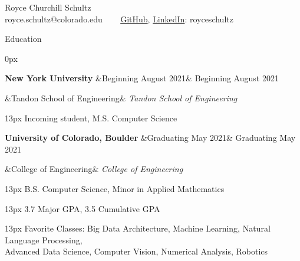 \documentclass{article}
\newcommand{\horizontalBreaker}{\ \ \ }
\newcommand{\sectionIndent}{13px}
\newcommand{\primaryFont}{\rmfamily}
\newcommand{\accentFont}{\sffamily}
\newcommand{\sectionHeader}[1]{
  \vspace{3px}
  \accentFont \color{primary} \large
  #1
  \color{black}
  \primaryFont
  \hrulefill
  \vspace{1px}
}
\newcommand{\itemHeader}[3]{
  \vspace{8px}
  \large \textbf{#1}
  \ifx&#3&
  \else
    \color{primary} \accentFont \normalsize
    \hfill #3
    \color{black} \primaryFont
  \fi

  \ifx&#2&
  \else
    \vspace{2px}
    \large
    \textit{#2}
  \fi
}
\newcommand{\itemContent}[1]{
  \vspace{1px} \normalsize
  \begin{addmargin}{\sectionIndent}
    #1
    \vspace{1px}
  \end{addmargin}
}
\begin{document}
  \begin{center}
      {\Huge  \primaryFont Royce Churchill Schultz}\\
          \vspace{6px}
      {\normalsize
          royce.schultz@colorado.edu \horizontalBreaker
          \href{https://www.github.com/royceschultz}{GitHub}, \href{https://linkedin.com/in/royceschultz}{LinkedIn}: royceschultz
      }
  \end{center}

  \sectionHeader{Education}
  \begin{addmargin}[\sectionIndent]{0px}
    \itemHeader
      {New York University}
      {Tandon School of Engineering}
      {Beginning August 2021}
    \itemContent{Incoming student, M.S. Computer Science}

    \itemHeader
      {University of Colorado, Boulder}
      {College of Engineering}
      {Graduating May 2021}
    \itemContent{B.S. Computer Science, Minor in Applied Mathematics}
    \itemContent{3.7 Major GPA, 3.5 Cumulative GPA}
    \itemContent{Favorite Classes: Big Data Architecture, Machine Learning, Natural Language Processing,\\Advanced Data Science, Computer Vision, Numerical Analysis, Robotics}
  \end{addmargin}
\end{document}
